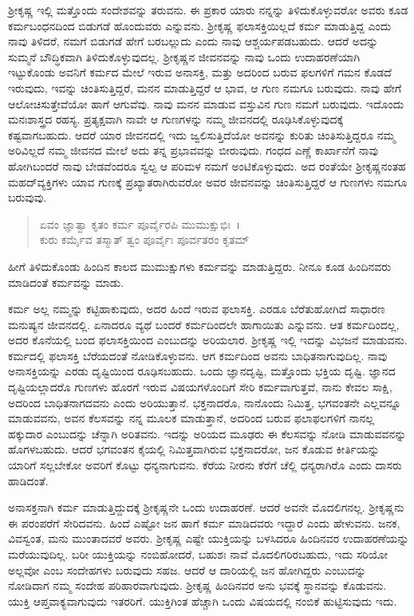 ಶ‍್ರೀಕೃಷ್ಣ ಇಲ್ಲಿ ಮತ್ತೊಂದು ಸಂದೇಶವನ್ನು ತರುವನು. ಈ ಪ್ರಕಾರ ಯಾರು ನನ್ನನ್ನು ತಿಳಿದುಕೊಳ್ಳುವರೋ ಅವರು ಕೂಡ ಕರ್ಮಬಂಧನದಿಂದ ಬಿಡುಗಡೆ ಹೊಂದುವರು ಎನ್ನುವನು. ಶ‍್ರೀಕೃಷ್ಣ ಫಲಾಸಕ್ತಿಯಿಲ್ಲದೆ ಕರ್ಮ ಮಾಡುತ್ತಿದ್ದ ಎಂದು ನಾವು ತಿಳಿದರೆ, ನಮಗೆ ಬಿಡುಗಡೆ ಹೇಗೆ ಬರಬಲ್ಲುದು ಎಂದು ನಾವು ಆಶ್ಚರ್ಯಪಡಬಹುದು. ಆದರೆ ಅದನ್ನು ಸುಮ್ಮನೆ ಬೌದ್ಧಿಕವಾಗಿ ತಿಳಿದುಕೊಳ್ಳುವುದಲ್ಲ. ಶ‍್ರೀಕೃಷ್ಣನ ಜೀವನವನ್ನು ನಾವು ಒಂದು ಉದಾಹರಣೆಯಾಗಿ ಇಟ್ಟುಕೊಂಡು ಅವನಿಗೆ ಕರ್ಮದ ಮೇಲೆ ಇರುವ ಅನಾಸಕ್ತಿ, ಮತ್ತು ಅದರಿಂದ ಬರುವ ಫಲಗಳಿಗೆ ಗಮನ ಕೊಡದೆ ಇರುವುದು, ಇವನ್ನು ಚಿಂತಿಸುತ್ತಿದ್ದರೆ, ಮನನ ಮಾಡುತ್ತಿದ್ದರೆ ಆ ಭಾವ, ಆ ಗುಣ ನಮಗೂ ಬರುವುದು. ನಾವು ಹೇಗೆ ಆಲೋಚಿಸುತ್ತೇವೆಯೋ ಹಾಗೆ ಆಗುವೆವು. ನಾವು ಮನನ ಮಾಡುವ ವಸ್ತುವಿನ ಗುಣ ನಮಗೆ ಬರುವುದು. ಇದೊಂದು ಮನಃಶಾಸ್ತ್ರದ ರಹಸ್ಯ. ಪ್ರತ್ಯಕ್ಷವಾಗಿ ನಾವೇ ಆ ಗುಣಗಳನ್ನು ನಮ್ಮ ಜೀವನದಲ್ಲಿ ರೂಢಿಸಿಕೊಳ್ಳುವುದಕ್ಕೆ ಕಷ್ಟವಾಗಬಹುದು. ಆದರೆ ಯಾರ ಜೀವನದಲ್ಲಿ ಇದು ಜ್ವಲಿಸುತ್ತಿದೆಯೋ ಅವನನ್ನು ಕುರಿತು ಚಿಂತಿಸುತ್ತಿದ್ದರೂ ನಮ್ಮ ಅರಿವಿಲ್ಲದೆ ನಮ್ಮ ಜೀವನದ ಮೇಲೆ ಅದು ತನ್ನ ಪ್ರಭಾವವನ್ನು ಬೀರುವುದು. ಗಂಧದ ಎಣ್ಣೆ ಕಾರ್ಖಾನೆಗೆ ನಾವು ಹೋಗಿಬಂದರೆ ನಾವು ಬೇಡವೆಂದರೂ ಸ್ವಲ್ಪ ಆ ಪರಿಮಳ ನಮಗೆ ಅಂಟಿಕೊಳ್ಳುವುದು. ಅದ ರಂತೆಯೇ ಶ‍್ರೀಕೃಷ್ಣನಂತಹ ಮಹದ್​ವ್ಯಕ್ತಿಗಳು ಯಾವ ಗುಣಕ್ಕೆ ಪ್ರಖ್ಯಾತರಾಗಿರುವರೋ ಅವರ ಜೀವನವನ್ನು ಚಿಂತಿಸುತ್ತಿದ್ದರೆ ಆ ಗುಣಗಳು ನಮಗೂ ಬರುವುವು.

\begin{verse}
ಏವಂ ಜ್ಞಾತ್ವಾ ಕೃತಂ ಕರ್ಮ ಪೂರ್ವೈರಪಿ ಮುಮುಕ್ಷುಭಿಃ~।\\ಕುರು ಕರ್ಮೈವ ತಸ್ಮಾತ್ ತ್ವಂ ಪೂರ್ವೈಃ ಪೂರ್ವತರಂ ಕೃತಮ್ 
\end{verse}

{\small ಹೀಗೆ ತಿಳಿದುಕೊಂಡು ಹಿಂದಿನ ಕಾಲದ ಮುಮುಕ್ಷುಗಳು ಕರ್ಮವನ್ನು ಮಾಡುತ್ತಿದ್ದರು. ನೀನೂ ಕೂಡ ಹಿಂದಿನವರು ಮಾಡಿದಂತೆ ಕರ್ಮವನ್ನು ಮಾಡು.}

ಕರ್ಮ ಅಲ್ಲ ನಮ್ಮನ್ನು ಕಟ್ಟಿಹಾಕುವುದು, ಅದರ ಹಿಂದೆ ಇರುವ ಫಲಾಸಕ್ತಿ. ಎರಡೂ ಬೆರೆತುಹೋಗಿದೆ ಸಾಧಾರಣ ಮನುಷ್ಯನ ಜೀವನದಲ್ಲಿ. ಏನಾದರೂ ವ್ಯಥೆ ಬಂದರೆ ಕರ್ಮದಿಂದಲೇ ಹಾಗಾಯಿತು ಎನ್ನುವನು. ಆತ ಕರ್ಮದಿಂದಲ್ಲ, ಅದರ ಕೊನೆಯಲ್ಲಿ ಬಂದ ಫಲಾಸಕ್ತಿಯಿಂದ ಎಂಬುದನ್ನು ಅರಿಯಲಾರ. ಶ‍್ರೀಕೃಷ್ಣ ಇಲ್ಲಿ ಇದನ್ನು ವಿಭಜನೆ ಮಾಡುವನು. ಕರ್ಮದಲ್ಲಿ ಫಲಾಸಕ್ತಿ ಬೆರೆಯದಂತೆ ನೋಡಿಕೊಳ್ಳುವನು. ಆಗ ಕರ್ಮದಿಂದ ಅವನು ಬಾಧಿತನಾಗುವುದಿಲ್ಲ. ನಾವು ಅನಾಸಕ್ತಿಯನ್ನು ಎರಡು ದೃಷ್ಟಿಯಿಂದ ರೂಢಿಸಬಹುದು. ಒಂದು ಜ್ಞಾನದೃಷ್ಟಿ, ಮತ್ತೊಂದು ಭಕ್ತಿಯ ದೃಷ್ಟಿ. ಜ್ಞಾನದ ದೃಷ್ಟಿಯಲ್ಲಾದರೊ ಗುಣಗಳು ಹೊರಗೆ ಇರುವ ವಿಷಯಗಳೊಂದಿಗೆ ಸೇರಿ ಕರ್ಮವಾಗುತ್ತವೆ, ನಾನು ಕೇವಲ ಸಾಕ್ಷಿ, ಅದರಿಂದ ಬಾಧಿತನಾಗದವನು ಎಂದು ಅರಿಯುತ್ತಾನೆ. ಭಕ್ತನಾದರೊ, ನಾನೊಂದು ನಿಮಿತ್ತ, ಭಗವಂತನೇ ಎಲ್ಲವನ್ನೂ ಮಾಡುವವನು, ಅವನ ಕೆಲಸವನ್ನು ನನ್ನ ಮೂಲಕ ಮಾಡುತ್ತಾನೆ, ಅದರಿಂದ ಬರುವ ಫಲಾಫಲಗಳಿಗೆ ನಾನಲ್ಲ ಹಕ್ಕುದಾರ ಎಂಬುದನ್ನು ಚೆನ್ನಾಗಿ ಅರಿತವನು. ಇದನ್ನು ಅರಿಯದ ಮೂಢರು ಈ ಕೆಲಸವನ್ನು ನೋಡಿ ಮಾಡುವವನನ್ನು ಹೊಗಳಬಹುದು. ಆದರೆ ಭಗವಂತನ ಕೈಯಲ್ಲಿ ನಿಮಿತ್ತವಾಗಿರುವ ಭಕ್ತನಾದರೋ, ಜನ ಕೊಡುವ ಕೀರ್ತಿಯನ್ನು ಯಾರಿಗೆ ಸಲ್ಲಬೇಕೋ ಅವರಿಗೆ ಕೊಟ್ಟು ಧನ್ಯನಾಗುವನು. ಕೆರೆಯ ನೀರನು ಕೆರೆಗೆ ಚೆಲ್ಲಿ ಧನ್ಯರಾಗಿರೊ ಎಂದು ದಾಸರು ಹಾಡಿದಂತೆ.

ಅನಾಸಕ್ತನಾಗಿ ಕರ್ಮ ಮಾಡುತ್ತಿದ್ದುದಕ್ಕೆ ಶ‍್ರೀಕೃಷ್ಣನೇ ಒಂದು ಉದಾಹರಣೆ. ಆದರೆ ಅವನೇ ಮೊದಲಿಗನಲ್ಲ. ಶ‍್ರೀಕೃಷ್ಣನು ಈ ಪರಂಪರೆಗೆ ಸೇರಿದವನು. ಹಿಂದೆ ಎಷ್ಟೋ ಜನ ಹಾಗೆ ಕರ್ಮ ಮಾಡಿದವರು ಇದ್ದಾರೆ ಎಂದು ಹೇಳುವನು. ಜನಕ, ವಿವಸ್ವಂತ, ಮನು ಮುಂತಾದವರೆ ಅವರು. ಶ‍್ರೀಕೃಷ್ಣ ಎಷ್ಟೇ ಯುಕ್ತಿಯನ್ನು ಬಳಸಿದರೂ ಹಿಂದಿನವರ ಉದಾಹರಣೆಯನ್ನು ಮರೆಯುವುದಿಲ್ಲ. ಬರೀ ಯುಕ್ತಿಯನ್ನು ನಂಬಿಹೋದರೆ, ಬಹುಶಃ ನಾವೆ ಮೊದಲಿಗರಿರಬಹುದು, ಇದು ಸರಿಯೋ ಅಲ್ಲವೋ ಎಂಬ ಸಂದೇಹಗಳು ಬರುವುದು ಸಹಜ. ಆದರೆ ಆ ದಾರಿಯಲ್ಲಿ ಜನ ಹೋಗಿದ್ದರು ಎಂಬುದನ್ನು ನೋಡಿದಾಗ ನಮ್ಮ ಸಂದೇಹ ಪರಿಹಾರವಾಗುವುದು. ಶ‍್ರೀಕೃಷ್ಣ ಹಿಂದಿನವರ ಅನು ಭವಕ್ಕೆ ಸ್ಥಾನವನ್ನು ಕೊಡುವನು. ಯುಕ್ತಿ ಆಪ್ತವಾಕ್ಯವಾಗುವುದು ಇತರರಿಗೆ. ಯುಕ್ತಿಗಿಂತ ಹೆಚ್ಚಾಗಿ ಒಂದು ವಿಷಯದಲ್ಲಿ ನಂಬಿಕೆ ಹುಟ್ಟಿಸುವುದು ಇದು.

